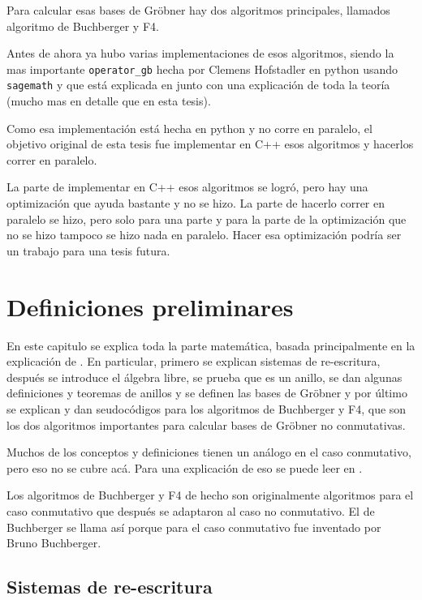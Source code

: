 \documentclass{report}
\theoremstyle{customstyle}
\theoremstyle{factstyle}
\begin{document}
Para calcular esas bases de Gröbner hay dos algoritmos principales, llamados algoritmo de Buchberger y F4.

Antes de ahora ya hubo varias implementaciones de esos algoritmos, siendo la mas importante \texttt{operator\_gb} hecha por Clemens Hofstadler en python usando \texttt{sagemath} y que está explicada en \cite{thesis:Hof20} junto con una explicación de toda la teoría (mucho mas en detalle que en esta tesis).

Como esa implementación está hecha en python y no corre en paralelo, el objetivo original de esta tesis fue implementar en C++ esos algoritmos y hacerlos correr en paralelo.

La parte de implementar en C++ esos algoritmos se logró, pero hay una optimización que ayuda bastante y no se hizo. La parte de hacerlo correr en paralelo se hizo, pero solo para una parte y para la parte de la optimización que no se hizo tampoco se hizo nada en paralelo. Hacer esa optimización podría ser un trabajo para una tesis futura.

\chapter{Definiciones preliminares}\label{cap:Definiciones preliminares}

En este capitulo se explica toda la parte matemática, basada principalmente en la explicación de \cite{thesis:Hof20}. En particular, primero se explican sistemas de re-escritura, después se introduce el álgebra libre, se prueba que es un anillo, se dan algunas definiciones y teoremas de anillos y se definen las bases de Gröbner y por último se explican y dan seudocódigos para los algoritmos de Buchberger y F4, que son los dos algoritmos importantes para calcular bases de Gröbner no conmutativas.

Muchos de los conceptos y definiciones tienen un análogo en el caso conmutativo, pero eso no se cubre acá. Para una explicación de eso se puede leer en \cite{book:ideals-varieties-algorithms}.

Los algoritmos de Buchberger y F4 de hecho son originalmente algoritmos para el caso conmutativo que después se adaptaron al caso no conmutativo. El de Buchberger se llama así porque para el caso conmutativo fue inventado por Bruno Buchberger.

\section{Sistemas de re-escritura}
\end{document}
